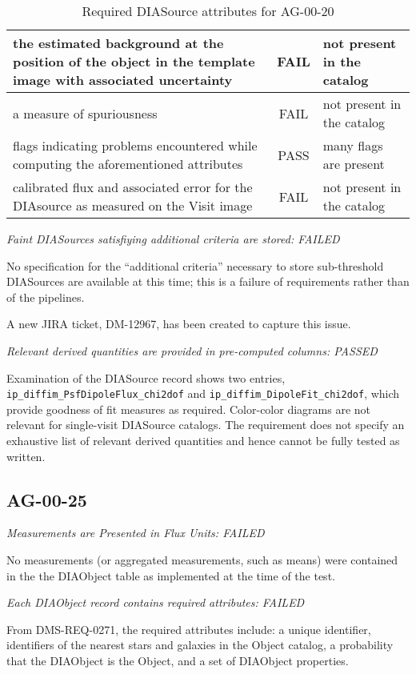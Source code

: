 \documentclass[DM,lsstdraft,STR,toc]{lsstdoc}
\begin{document}
\begin{table}[h]
\begin{tabular}{|p{}|c|p{}|}
		\hline
	the estimated background at the position of the object in the template image with associated uncertainty & FAIL & not present in the catalog \\
		\hline
	a measure of spuriousness & FAIL &  not present in the catalog \\
		\hline
	flags indicating problems encountered while computing the aforementioned attributes & PASS & many flags are present \\
		\hline
  calibrated flux and associated error for the DIAsource as measured on the Visit image & FAIL & not present in the catalog \\
		\hline
\end{tabular}
	\caption{Required DIASource attributes for AG-00-20 \label{tab:diasrc}}
\end{table}


\textit{Faint DIASources satisfiying additional criteria are stored: FAILED}

No specification for the ``additional criteria'' necessary to store 
sub-threshold DIASources are available at this time; 
this is a failure of requirements rather than of the pipelines.

A new JIRA ticket, DM-12967, has been created to capture this issue.

\textit{Relevant derived quantities are provided in pre-computed columns: PASSED}

Examination of the DIASource record shows two entries,
\texttt{ip\_diffim\_PsfDipoleFlux\_chi2dof} and
\texttt{ip\_diffim\_DipoleFit\_chi2dof}, which provide goodness of fit measures
as required.  Color-color diagrams are not relevant for single-visit DIASource
catalogs. The requirement does not specify an exhaustive list of relevant
derived quantities and hence cannot be fully tested as written.

\subsection{AG-00-25}

\textit{Measurements are Presented in Flux Units: FAILED}

No measurements (or aggregated measurements, such as means) 
were contained in the the DIAObject table as implemented at the 
time of the test.

\textit{Each DIAObject record contains required attributes: FAILED}

From DMS-REQ-0271, the required attributes include: a unique identifier, 
identifiers of the nearest stars and galaxies in the Object catalog, 
a probability that the DIAObject is the Object, and a set of DIAObject 
properties.
\end{document}
